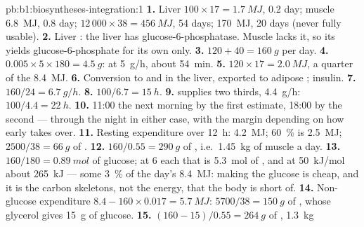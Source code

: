 \begin{solution}{pb:b1:biosyntheses-integration:1}
\textbf{1.} Liver  $100\times 17 = \qty{1.7}{MJ}$, 0.2 day;
muscle  \qty{6.8}{MJ}, 0.8 day;  $12\,000\times 38 =
\qty{456}{MJ}$, 54 days;  \qty{170}{MJ}, 20 days (never fully
usable).
\textbf{2.} Liver : the liver has glucose-6-phosphatase.
Muscle lacks it, so its  yields glucose-6-phosphate for its
own  only.
\textbf{3.} $120 + 40 = \qty{160}{g}$ per day.
\textbf{4.} $0.005\times 5\times 180 = \qty{4.5}{g}$: at \qty{5}{g/h}, about \qty{54}{min}.
\textbf{5.} $120\times 17 = \qty{2.0}{MJ}$, a quarter of the \qty{8.4}{MJ}.
\textbf{6.} Conversion to  and  in the liver,
exported to adipose ; insulin.
\textbf{7.} $160/24 = \qty{6.7}{g/h}$.
\textbf{8.} $100/6.7 = \qty{15}{h}$.
\textbf{9.}  supplies two thirds, \qty{4.4}{g/h}: $100/4.4 =
\qty{22}{h}$.
\textbf{10.} 11:00 the next morning by the first estimate, 18:00 by the
second --- through the night in either case, with the margin
depending on how early  takes over.
\textbf{11.} Resting expenditure over \qty{12}{h}: \qty{4.2}{MJ};
\qty{60}{\%} is \qty{2.5}{MJ}; $2500/38 = \qty{66}{g}$ of .
\textbf{12.} $160/0.55 = \qty{290}{g}$ of , i.e.\ \qty{1.45}{kg}
of muscle a day.
\textbf{13.} $160/180 = \qty{0.89}{mol}$ of glucose; at 6 
each that is \qty{5.3}{mol} of , and at \qty{50}{kJ/mol}
about \qty{265}{kJ} --- some \qty{3}{\%} of the day's \qty{8.4}{MJ}: making the
glucose is cheap, and it is the carbon skeletons, not the energy, that
the body is short of.
\textbf{14.} Non-glucose expenditure $8.4 - 160\times 0.017 =
\qty{5.7}{MJ}$: $5700/38 = \qty{150}{g}$ of , whose glycerol gives
\qty{15}{g} of glucose.
\textbf{15.} $(160 - 15)/0.55 = \qty{264}{g}$ of , \qty{1.3}{kg}

\end{solution}
